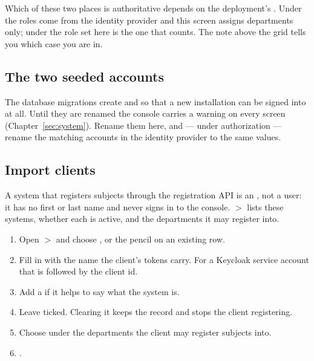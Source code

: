 \documentclass[11pt, a4paper]{article}
\begin{document}
\begin{elicitnote}
Which of these two places is authoritative depends on the deployment's
. Under  the roles come from the identity
provider and this screen assigns departments only; under  the role set here is
the one that counts. The note above the grid tells you which case you are in.
\end{elicitnote}

\subsection{The two seeded accounts}

The database migrations create  and  so that a new installation can be
signed into at all. Until they are renamed the console carries a warning on every screen
(Chapter~\ref{sec:system}). Rename them here, and — under  authorization — rename the matching
accounts in the identity provider to the same values.

\subsection{Import clients}
\label{sec:import-clients}

A system that registers subjects through the registration API is an , not a
user: it has no first or last name and never signs in to the console.  $>$
 lists these systems, whether each is active, and the departments it may
register into.


\begin{enumerate}
  \item Open  $>$  and choose , or the pencil
        on an existing row.
  \item Fill in  with the name the client's tokens carry. For a Keycloak service
        account that is  followed by the client id.
  \item Add a  if it helps to say what the system is.
  \item Leave  ticked. Clearing it keeps the record and stops the client registering.
  \item Choose under  the departments the client may register subjects into.
  \item {}.
\end{enumerate}
\end{document}
